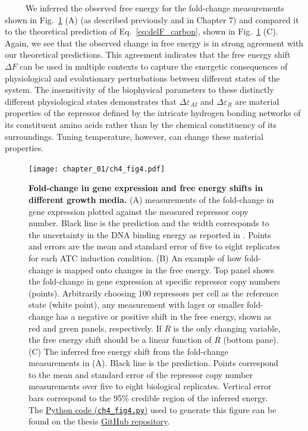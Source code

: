 \documentclass[12pt]{caltech_thesis}
\begin{document}
~~~~~We inferred the observed free energy for the fold-change
measurements shown in Fig.~\ref{fig:carbon_quality_delF} (A) (as
described previously \autocite{chure2019} and in Chapter 7) and compared
it to the theoretical prediction of Eq.~\ref{eq:delF_carbon}, shown in
Fig.~\ref{fig:carbon_quality_delF} (C). Again, we see that the observed
change in free energy is in strong agreement with our theoretical
predictions. This agreement indicates that the free energy shift
\(\Delta F\) can be used in multiple contexts to capture the energetic
consequences of physiological and evolutionary perturbations between
different states of the system. The insensitivity of the biophysical
parameters to these distinctly different physiological states
demonstrates that \(\Delta\varepsilon_{AI}\) and
\(\Delta\varepsilon_{R}\) are material properties of the repressor
defined by the intricate hydrogen bonding networks of its constituent
amino acids rather than by the chemical constituency of its
surroundings. Tuning temperature, however, can change these material
properties.

\hypertarget{fig:carbon_quality_delF}{%
\begin{figure}
\centering
\texttt{[image: chapter\_01/ch4\_fig4.pdf]}
\caption[{Fold-change in gene expression and free energy shifts in
different growth media.}]{\textbf{Fold-change in gene expression and
free energy shifts in different growth media.} (A) measurements of the
fold-change in gene expression plotted against the measured repressor
copy number. Black line is the prediction and the width corresponds to
the uncertainty in the DNA binding energy as reported in
\textcite{garcia2011}. Points and errors are the mean and standard error
of five to eight replicates for each ATC induction condition. (B) An
example of how fold-change is mapped onto changes in the free energy.
Top panel shows the fold-change in gene expression at specific repressor
copy numbers (points). Arbitrarily choosing 100 repressors per cell as
the reference state (white point), any measurement with lager or smaller
fold-change has a negative or positive shift in the free energy, shown
as red and green panels, respectively. If \(R\) is the only changing
variable, the free energy shift should be a linear function of \(R\)
(bottom pane). (C) The inferred free energy shift from the fold-change
measurements in (A). Black line is the prediction. Points correspond to
the mean and standard error of the repressor copy number measurements
over five to eight biological replicates. Vertical error bars correspond
to the 95\% credible region of the inferred energy. The
\href{https://github.com/gchure/phd/blob/master/src/chapter_04/code/ch4_fig4.py}{Python
code (\texttt{ch4\_fig4.py})} used to generate this figure can be found
on the thesis \href{https://github.com/gchure/phd}{GitHub repository}.}
\label{fig:carbon_quality_delF}
\end{figure}
}
\end{document}
